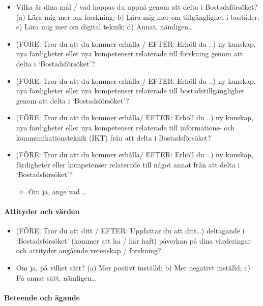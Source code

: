 \documentclass[]{tufte-handout}
\providecommand{\tightlist}{%
  \setlength{\itemsep}{0pt}\setlength{\parskip}{0pt}}
\begin{document}
\begin{itemize}
\tightlist
\item
  Vilka är dina mål / vad hoppas du uppnå genom att delta i
  Bostadsförsöket? (a) Lära mig mer om forskning; b) Lära mig mer om
  tillgänglighet i bostäder; c) Lära mig mer om digital teknik; d)
  Annat, nämligen\ldots{}
\item
  (FÖRE: Tror du att du kommer erhålla / EFTER: Erhöll du ..) ny
  kunskap, nya färdigheter eller nya kompetenser relaterade till
  forskning genom att delta i `Bostadsförsöket'?
\item
  (FÖRE: Tror du att du kommer erhålla / EFTER: Erhöll du ..) ny
  kunskap, nya färdigheter eller nya kompetenser relaterade till
  bostadstillgänglighet genom att delta i `Bostadsförsöket'?
\item
  (FÖRE: Tror du att du kommer erhålla/ EFTER: Erhöll du ..) ny kunskap,
  nya färdigheter eller nya kompetenser relaterade till informations-
  och kommunikationsteknik (IKT) från att delta i Bostadsförsöket?
\item
  (FÖRE: Tror du att du kommer erhålla/ EFTER: Erhöll du ..) ny kunskap,
  färdigheter eller kompetenser relaterade till något annat från att
  delta i `Bostadsförsöket'?

  \begin{itemize}
  \tightlist
  \item
    Om ja, ange vad \ldots{}
  \end{itemize}
\end{itemize}

\hypertarget{attityder-och-vuxe4rden}{%
\paragraph{Attityder och värden}\label{attityder-och-vuxe4rden}}

\begin{itemize}
\tightlist
\item
  (FÖRE: Tror du att ditt / EFTER: Uppfattar du att ditt\ldots)
  deltagande i `Bostadsförsöket' (kommer att ha / har haft) påverkan på
  dina värderingar och attityder angående vetenskap / forskning?
\item
  Om ja, på vilket sätt? (a) Mer postivt inställd; b) Mer negativt
  inställd; c) På annat sätt, nämligen\ldots{}
\end{itemize}

\hypertarget{beteende-och-uxe4gande}{%
\paragraph{Beteende och ägande}\label{beteende-och-uxe4gande}}
\end{document}
